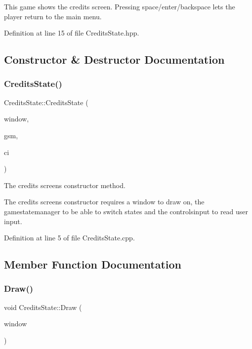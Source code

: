 This game shows the credits screen. Pressing space/enter/backspace lets the player return to the main menu. 

Definition at line 15 of file Credits\+State.\+hpp.



\subsection{Constructor \& Destructor Documentation}
\mbox{\label{class_credits_state_a95163ef799a4afe3688d88e7cc8ae3b3}} 
\subsubsection{\texorpdfstring{Credits\+State()}{CreditsState()}}
{\footnotesize\ttfamily Credits\+State\+::\+Credits\+State (\begin{DoxyParamCaption}\item[{sf\+::\+Render\+Window \&}]{window,  }\item[{\hyperlink{class_game_state_manager}{Game\+State\+Manager} \&}]{gsm,  }\item[{\hyperlink{struct_controls_input}{Controls\+Input} \&}]{ci }\end{DoxyParamCaption})}



The credits screen\textquotesingle{}s constructor method. 

The credits screen\textquotesingle{}s constructor requires a window to draw on, the gamestatemanager to be able to switch states and the controlsinput to read user input. 

Definition at line 5 of file Credits\+State.\+cpp.



\subsection{Member Function Documentation}
\mbox{\label{class_credits_state_a085e7decf7f1fc7edae68db50851b84a}} 
\subsubsection{\texorpdfstring{Draw()}{Draw()}}
{\footnotesize\ttfamily void Credits\+State\+::\+Draw (\begin{DoxyParamCaption}\item[{sf\+::\+Render\+Window \&}]{window }\end{DoxyParamCaption})\hspace{0.3cm}{\ttfamily [virtual]}}



